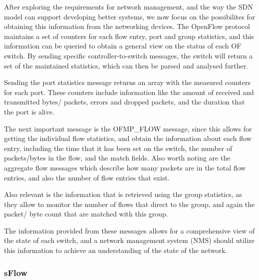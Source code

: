 After exploring the requirements for network management, and the way the SDN model can support developing better systems, we now focus on the possibilites for obtaining this information from the networking devices. The OpenFlow 
protocol maintains a set of counters for each flow entry, port and group statistics, and this information can be queried to obtain a general view on the status of each OF switch. By sending specific controller-to-switch messages,
the switch will return a set of the maintained statistics, which can then be parsed and analysed further. 
\par Sending the port statistics message returns an array with the measured counters for each port. These counters include information like the amount of received and transmitted bytes/ packets, errors and dropped packets, and the
duration that the port is alive. 
\par The next important message is the \textsc{OFMP\_FLOW} message, since this allows for getting the individual flow statistics, and obtain the information about each flow entry, including the time that it has been set on the switch,
the number of packets/bytes in the flow, and the match fields. Also worth noting are the aggregate flow messages which describe how many packets are in the total flow entries, and also the number of flow entries that exist.
\par Also relevant is the information that is retrieved using the group statistics, as they allow to monitor the number of flows that direct to the group, and again the packet/ byte count that are matched with this group.
\par The information provided from these messages allows for a comprehensive view of the state of each switch, and a network management system (NMS) should utilize this information to achieve an understanding of the 
state of the network. 

\subsubsection {sFlow}


